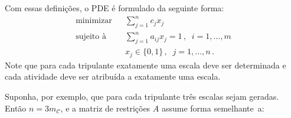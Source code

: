 \documentclass[12pt,a4paper]{article}
\newcommand{\ev}{\, ,}                                       %
\newcommand{\ep}{\, .}                                       %
\newcommand{\calC}{\mathcal{C}}
\begin{document}
Com essas definições, o PDE é formulado da seguinte forma:
%
\begin{eqnarray} \label{eq:sppe}
	\text{minimizar} && \displaystyle \sum_{j=1}^n c_j x_j \nonumber \\
	\text{sujeito à} && \displaystyle \sum_{j=1}^n a_{ij} x_j = 1 \ev \;\; i = 1, \ldots, m \\
	                 && x_j \in \{0, 1\} \ev \;\; j = 1, \ldots, n \ep \nonumber
\end{eqnarray} 
%
Note que para cada tripulante exatamente uma escala deve ser determinada e cada atividade deve ser
atribuída a exatamente uma escala.

Suponha, por exemplo, que para cada tripulante três escalas sejam geradas. Então $n = 3m_\calC$, 
e a matriz de restrições $A$ assume forma semelhante~a:
\end{document}
